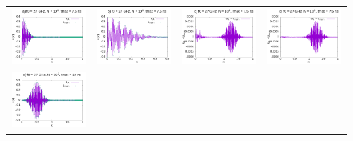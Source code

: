 \documentclass[11pt,a4paper]{report}
\begin{document}
\begin{figure}
\begin{tabular}{cccc}
  \includegraphics[width=45mm]{plots/27/mc27_3_075} & 
  \includegraphics[width=45mm]{plots/27/closeup/mc27_3_075} &     \includegraphics[width=45mm]{plots/27/mc27_3_075_dif} &   \includegraphics[width=45mm]{plots/27/mc27_5_075_dif} \\
\includegraphics[width=45mm]{plots/27/mc27_3_10} &   

\end{tabular}
\end{figure}
\end{document}
